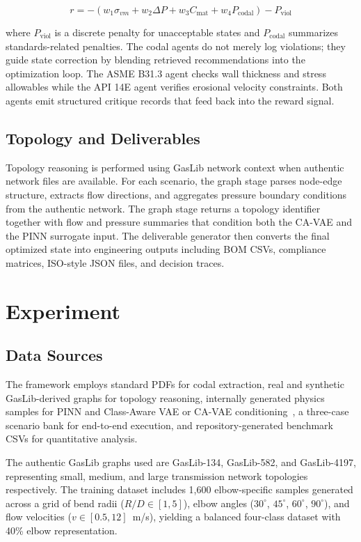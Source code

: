 \documentclass[conference]{IEEEtran}
\begin{document}
\begin{equation}
r = -\left(w_1 \sigma_{vm} + w_2 \Delta P + w_3 C_{\text{mat}} + w_4 P_{\text{codal}}\right) - P_{\text{viol}}
\end{equation}

where \(P_{\text{viol}}\) is a discrete penalty for unacceptable states and \(P_{\text{codal}}\) summarizes standards-related penalties. The codal agents do not merely log violations; they guide state correction by blending retrieved recommendations into the optimization loop. The ASME B31.3 agent checks wall thickness and stress allowables while the API 14E agent verifies erosional velocity constraints. Both agents emit structured critique records that feed back into the reward signal.
 
\subsection{Topology and Deliverables}

Topology reasoning is performed using GasLib network context when authentic network files are available. For each scenario, the graph stage parses node-edge structure, extracts flow directions, and aggregates pressure boundary conditions from the authentic network. The graph stage returns a topology identifier together with flow and pressure summaries that condition both the CA-VAE and the PINN surrogate input. The deliverable generator then converts the final optimized state into engineering outputs including BOM CSVs, compliance matrices, ISO-style JSON files, and decision traces.
 
\section{Experiment}

\subsection{Data Sources}

The framework employs standard PDFs for codal extraction, real and synthetic GasLib-derived graphs for topology reasoning, internally generated physics samples for PINN and Class-Aware VAE or CA-VAE conditioning~\cite{10219816}, a three-case scenario bank for end-to-end execution, and repository-generated benchmark CSVs for quantitative analysis.

The authentic GasLib graphs used are GasLib-134, GasLib-582, and GasLib-4197, representing small, medium, and large transmission network topologies respectively. The training dataset includes 1{,}600 elbow-specific samples generated across a grid of bend radii ($R/D \in [1,5]$), elbow angles ($30^\circ$, $45^\circ$, $60^\circ$, $90^\circ$), and flow velocities ($v \in [0.5,12]$~m/s), yielding a balanced four-class dataset with 40\% elbow representation.
 
\end{document}
